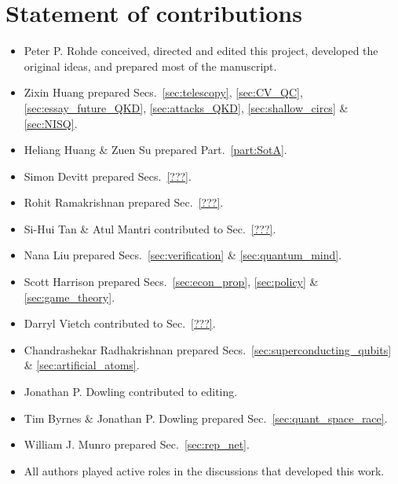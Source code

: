 %
%

\section*{Statement of contributions}

\begin{itemize}
	\item Peter P. Rohde conceived, directed and edited this project, developed the original ideas, and prepared most of the manuscript.
	\item Zixin Huang prepared Secs.~\ref{sec:telescopy}, \ref{sec:CV_QC}, \ref{sec:essay_future_QKD}, \ref{sec:attacks_QKD}, \ref{sec:shallow_circs} \& \ref{sec:NISQ}.
	\item Heliang Huang \& Zuen Su prepared Part.~\ref{part:SotA}.
	\item Simon Devitt prepared Secs.~\ref{???}.
	\item Rohit Ramakrishnan prepared Sec.~\ref{???}.
	\item Si-Hui Tan \& Atul Mantri contributed to Sec.~\ref{???}.
	\item Nana Liu prepared Secs.~\ref{sec:verification} \& \ref{sec:quantum_mind}.
	\item Scott Harrison prepared Secs.~\ref{sec:econ_prop}, \ref{sec:policy} \& \ref{sec:game_theory}.
	\item Darryl Vietch contributed to Sec.~\ref{???}.
	\item Chandrashekar Radhakrishnan prepared Secs.~\ref{sec:superconducting_qubits} \& \ref{sec:artificial_atoms}.
	\item Jonathan P. Dowling contributed to editing.
	\item Tim Byrnes \& Jonathan P. Dowling prepared Sec.~\ref{sec:quant_space_race}.
	\item William J. Munro prepared Sec.~\ref{sec:rep_net}. 
	\item All authors played active roles in the discussions that developed this work. 
\end{itemize}